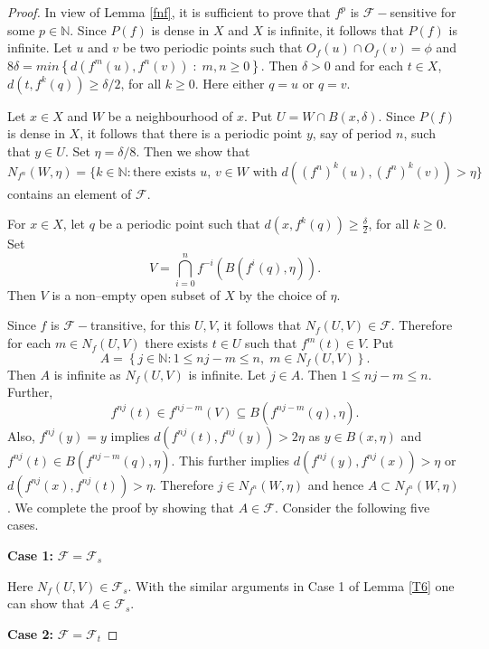 \documentclass[10pt,a4paper]{amsart}
\def\FS{{\mathscr F_s}}
\def\F{{\mathscr{F}}}
\def\N{{\mathbb N}}
\begin{document}
\begin{proof}
	In view of Lemma \ref{fnf}, it is sufficient to prove that $f^p$ is $\F-$sensitive for some $p \in \N$. Since $P(f)$ is dense in $X$ and $X$ is infinite, it follows that $P(f)$ is infinite. Let $u$ and $v$ be two periodic points such that $O_f(u)\cap O_f(v)=\phi$ and $8\delta =min\left\{d\left(f^m(u), f^n(v)\right) \; : \; m, n \geq 0 \right\}$. Then $\delta > 0$ and for each $t\in X$, $d\left(t, f^k(q)\right)\geq\delta/2$, for all $k\geq 0$. Here either $q=u$ or $q=v$.
	
	\medskip
	\noindent	Let $x \in X$ and $W$ be a neighbourhood of $x$. Put $U=W\cap B(x,\delta)$. Since $P(f)$ is dense in $X$, it follows that there is a periodic point $y$, say of period $n$, such that $y \in U$. Set $\eta = \delta/8$. Then we show that $N_{f^n}(W,\eta)=\{k\in \N: \mbox{there exists $u$, $v\in W$ with } d\left((f^n)^k(u),(f^n)^k(v)\right)>\eta\}$ contains an element of $\F$. 
	
	\smallskip
	\noindent For $x\in X$, let $q$ be a periodic point such that $d(x,f^k(q))\geq \frac{\delta}{2}$, for all $k\geq 0$. Set $$V=\bigcap_{i=0}^{n}f^{-i}\left(B(f^i(q),\eta)\right).$$ Then $V$ is a non--empty open subset of $X$ by the choice of $\eta$. 
	
	\medskip
	\noindent Since $f$ is $\mathscr{F}-$transitive, for this $U,V$, it follows that $N_f(U,V)\in \mathscr{F}$. Therefore for each $m\in N_f(U,V)$ there exists $t\in U$ such that $f^m(t)\in V$. Put 
	$$A=\left\{j\in \N:1\leq nj-m\leq n, \; m\in N_f(U,V)\right\}.$$ 
	Then $A$ is infinite as $N_f(U,V)$ is infinite. Let $j\in A$. Then $1\leq nj-m\leq n$. Further,
	$$f^{nj}(t)\in f^{nj-m}(V)\subseteq B(f^{nj-m}(q),\eta).$$
	Also, $f^{nj}(y)=y$ implies $ d(f^{nj}(t),f^{nj}(y))>2\eta $ as $y\in B(x,\eta)$ and $f^{nj}(t)\in B(f^{nj-m}(q),\eta)$. This further implies $d(f^{nj}(y),f^{nj}(x))>\eta$ or $d(f^{nj}(x),f^{nj}(t))>\eta$. Therefore $j\in N_{f^n}(W,\eta)$ and hence $A\subset N_{f^n}(W,\eta)$. We complete the proof by showing that $A\in \F$. Consider the following five cases.
	
	\medskip
	\noindent \textbf{Case 1:} $\F=\FS$
	
	\noindent Here $N_f(U,V)\in \F_s$. With the similar arguments in Case 1 of Lemma \ref{T6} one can show that $A\in \F_s$.  
	
	\medskip
	\noindent \textbf{Case 2:} $\F=\F_t$
	

\end{proof}
\end{document}
